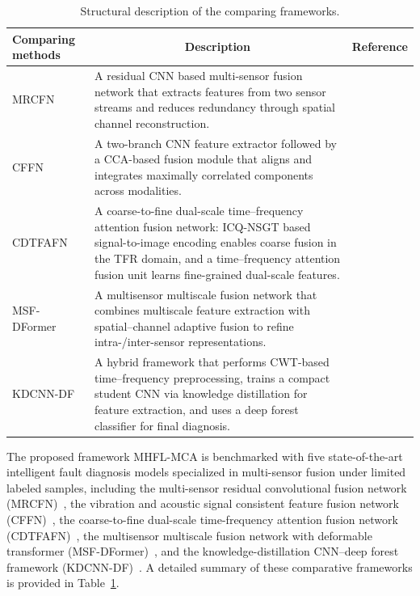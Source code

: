 \documentclass[a4paper]{cas-sc}
\begin{document}
\begin{table}[pos=htbp]
\centering
\small
\renewcommand{\arraystretch}{1.15}
\caption{Structural description of the comparing frameworks.}
\label{tab:compare_frameworks}
\begin{tabularx}{\textwidth}{@{}
>{\centering\arraybackslash}m{2.6cm}
X
>{\centering\arraybackslash}m{2.2cm}
@{}}
\toprule
\textbf{Comparing methods} & \multicolumn{1}{c}{\textbf{Description}} & \textbf{Reference} \\
\midrule

MRCFN &
A residual CNN based multi-sensor fusion network that extracts features from two sensor streams and reduces redundancy through spatial channel reconstruction. &
\cite{MRCFN} \\
\midrule

CFFN &
A two-branch CNN feature extractor followed by a CCA-based fusion module that aligns and integrates maximally correlated components across modalities. &
\cite{CFFN} \\
\midrule

CDTFAFN &
A coarse-to-fine dual-scale time--frequency attention fusion network: ICQ-NSGT based signal-to-image encoding enables coarse fusion in the TFR domain, and a time--frequency attention fusion unit learns fine-grained dual-scale features. &
\cite{CDTFAFN} \\
\midrule

MSF-DFormer &
A multisensor multiscale fusion network that combines multiscale feature extraction with spatial--channel adaptive fusion to refine intra-/inter-sensor representations. &
\cite{MSFDFormer} \\
\midrule

KDCNN-DF &
A hybrid framework that performs CWT-based time--frequency preprocessing, trains a compact student CNN via knowledge distillation for feature extraction, and uses a deep forest classifier for final diagnosis. &
\cite{KDCNNDF} \\

\bottomrule
\end{tabularx}
\end{table}

The proposed framework MHFL-MCA is benchmarked with five state-of-the-art intelligent fault diagnosis models 
specialized in multi-sensor fusion under limited labeled samples, including the multi-sensor residual
convolutional fusion network (MRCFN)~\cite{MRCFN}, the vibration and acoustic signal consistent feature
fusion network (CFFN)~\cite{CFFN},
the coarse-to-fine dual-scale time-frequency attention fusion network (CDTFAFN)~\cite{CDTFAFN}, the
multisensor multiscale fusion network with deformable transformer (MSF-DFormer)~\cite{MSFDFormer}, and the
knowledge-distillation CNN--deep forest framework (KDCNN-DF)~\cite{KDCNNDF}. A detailed summary of these comparative frameworks is provided in Table~\ref{tab:compare_frameworks}. 
\end{document}
